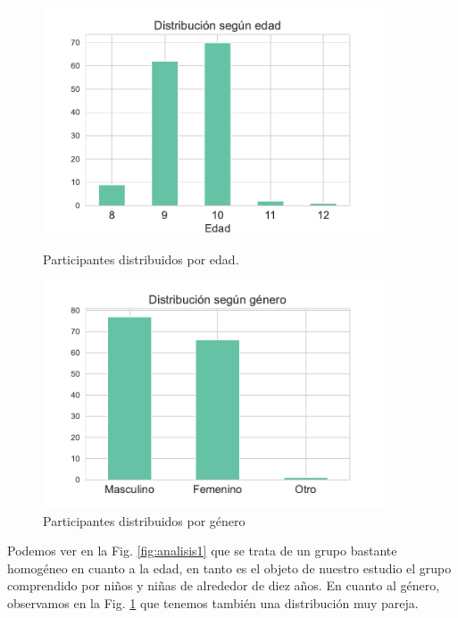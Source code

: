 \begin{figure}[h]
    \centering
    \begin{minipage}{0.50\textwidth}
        \centering
        \includegraphics[width=0.9\textwidth]{images_analisis/1.pdf} 
        \caption{Participantes distribuidos por edad.}
        \label{fig:analisis1}
    \end{minipage}\hfill
    \begin{minipage}{0.50\textwidth}
        \centering
        \includegraphics[width=0.9\textwidth]{images_analisis/2.pdf} 
        \caption{Participantes distribuidos por género}
        \label{fig:analisis2}
    \end{minipage}
\end{figure}

Podemos ver en la Fig. \ref{fig:analisis1} que se trata de un grupo bastante homogéneo en cuanto a la edad, en tanto es el objeto de nuestro estudio el grupo comprendido por niños y niñas de alrededor de diez años. En cuanto al género, observamos en la Fig. \ref{fig:analisis2} que tenemos también una distribución muy pareja.

